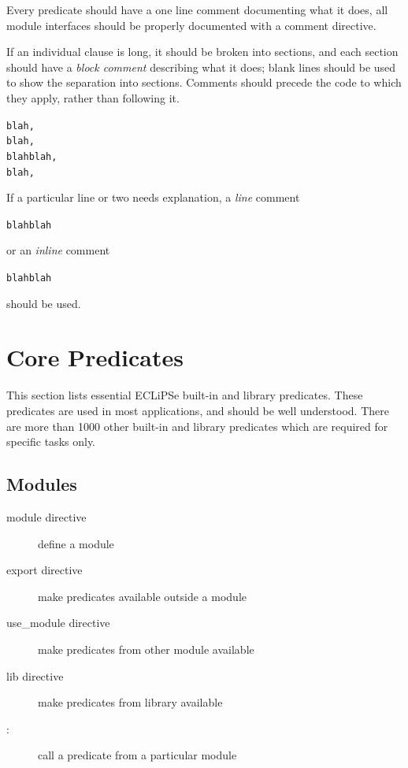 \documentclass[a4paper,12pt]{report}
\begin{document}
Every predicate should have a one line comment documenting what it does, 
all module interfaces should be properly documented with a comment directive.

If an individual clause is long, it should be broken into sections, and
each section should have a {\it block comment} describing what it does; blank
lines should be used to show the separation into sections.  Comments should
precede the code to which they apply, rather than following it.

\begin{alltt}
%
%
        blah,
        blah,
        blahblah,
        blah,
\end{alltt}

If a particular line or two needs explanation, a {\it line} comment 

\begin{alltt}
        blahblah
\end{alltt}

or an {\it inline} comment 

\begin{alltt}
        blahblah        %
\end{alltt}

should be used.

\chapter{Core Predicates}
\label{corepredicates}

This section lists essential ECLiPSe built-in and library predicates. These predicates are used in most applications, and should be well understood. There are more than 1000 other built-in and library predicates which are required for specific tasks only. 
\section{Modules}
\begin{description}
\item[module directive] define a module
\item[export directive] make predicates available outside a module
\item[use\_module directive] make predicates from other module available
\item[lib directive] make predicates from library available
\item[:] call a predicate from a particular module
\end{description}
\end{document}

